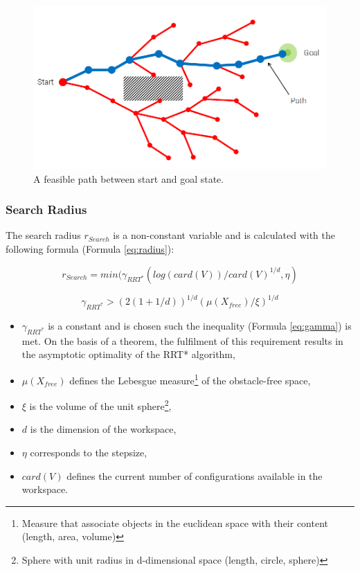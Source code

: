 \begin{figure} [h]
	\centering
	\includegraphics[width=1\textwidth]{images/rrt4.png}
	\caption{A feasible path between start and goal state.}
	\label{pics:rrt4}
\end{figure}
   
\subsubsection{Search Radius}

The search radius $r_{Search}$ is a non-constant variable and is calculated with the following formula (Formula \ref{eq:radius}):

\begin{equation}
r_{Search} = min(\gamma_{RRT^{*}}(log(card(V))/card(V)^{1/d},\eta)  
\label{eq:radius}
\end{equation}

\begin{equation}
\gamma_{RRT^{*}}>(2(1+1/d))^{1/d}(\mu(X_{free})/\xi)^{1/d}
\label{eq:gamma}
\end{equation}

\begin{itemize}
	\item
	$\gamma_{RRT^{*}}$ is a constant and is chosen such the inequality (Formula \ref{eq:gamma}) is met. On the basis of a theorem, the fulfilment of this requirement results in the asymptotic optimality of the RRT* algorithm,
	\item
	$\mu(X_{free})$ defines the Lebesgue measure\footnote{Measure that associate objects in the euclidean space with their content (length, area, volume)  } of the obstacle-free space,
	\item
	$\xi$ is the volume of the unit sphere\footnote{Sphere with unit radius in d-dimensional space (length, circle, sphere)},
	\item
	$d$ is the dimension of the workspace,
	\item
	$\eta$ corresponds to the stepsize,
	\item
	$card(V)$ defines the current number of configurations available in the workspace.
\end{itemize}

